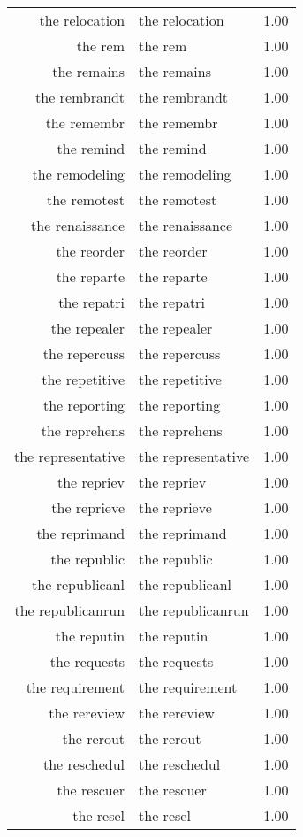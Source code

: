 \begin{table}[ht]
\begin{tabular}{rlr}
  the relocation & the relocation & 1.00 \\ 
  the rem & the rem & 1.00 \\ 
  the remains & the remains & 1.00 \\ 
  the rembrandt & the rembrandt & 1.00 \\ 
  the remembr & the remembr & 1.00 \\ 
  the remind & the remind & 1.00 \\ 
  the remodeling & the remodeling & 1.00 \\ 
  the remotest & the remotest & 1.00 \\ 
  the renaissance & the renaissance & 1.00 \\ 
  the reorder & the reorder & 1.00 \\ 
  the reparte & the reparte & 1.00 \\ 
  the repatri & the repatri & 1.00 \\ 
  the repealer & the repealer & 1.00 \\ 
  the repercuss & the repercuss & 1.00 \\ 
  the repetitive & the repetitive & 1.00 \\ 
  the reporting & the reporting & 1.00 \\ 
  the reprehens & the reprehens & 1.00 \\ 
  the representative & the representative & 1.00 \\ 
  the repriev & the repriev & 1.00 \\ 
  the reprieve & the reprieve & 1.00 \\ 
  the reprimand & the reprimand & 1.00 \\ 
  the republic & the republic & 1.00 \\ 
  the republicanl & the republicanl & 1.00 \\ 
  the republicanrun & the republicanrun & 1.00 \\ 
  the reputin & the reputin & 1.00 \\ 
  the requests & the requests & 1.00 \\ 
  the requirement & the requirement & 1.00 \\ 
  the rereview & the rereview & 1.00 \\ 
  the rerout & the rerout & 1.00 \\ 
  the reschedul & the reschedul & 1.00 \\ 
  the rescuer & the rescuer & 1.00 \\ 
  the resel & the resel & 1.00 \\ 

\end{tabular}
\end{table}
